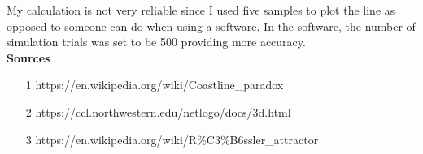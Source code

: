 \documentclass[12pt]{article}
\begin{document}
My calculation is not very reliable since I used five samples to plot the line as opposed to someone can do when using a software. In the software, the number of simulation trials was set to be 500 providing more accuracy. \\






{\Large{\textbf{Sources}}}\\
\begin{enumerate}
\item[1] https://en.wikipedia.org/wiki/Coastline_paradox
\item[2] https://ccl.northwestern.edu/netlogo/docs/3d.html
\item[3] https://en.wikipedia.org/wiki/R\%C3\%B6ssler_attractor
\end{enumerate}




\vspace{0.5 in}
\end{document}
